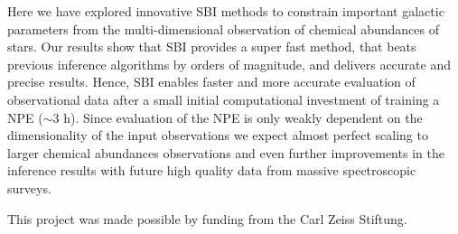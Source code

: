 \documentclass{aa}
\begin{document}
Here we have explored innovative SBI methods to constrain important galactic parameters from the multi-dimensional observation of chemical abundances of stars. Our results show that SBI provides a super fast method, that beats previous inference algorithms by orders of magnitude, and delivers accurate and precise results. Hence, SBI enables faster and more accurate evaluation of observational data after a small initial computational investment of training a NPE ($\sim3$ h). Since evaluation of the NPE is only weakly dependent on the dimensionality of the input observations we expect almost perfect scaling to larger chemical abundances observations and even further improvements in the inference results with future high quality data from massive spectroscopic surveys. 


\begin{acknowledgements}
      This project was made possible by funding from the Carl Zeiss Stiftung.
\end{acknowledgements}

%
%



\end{document}

